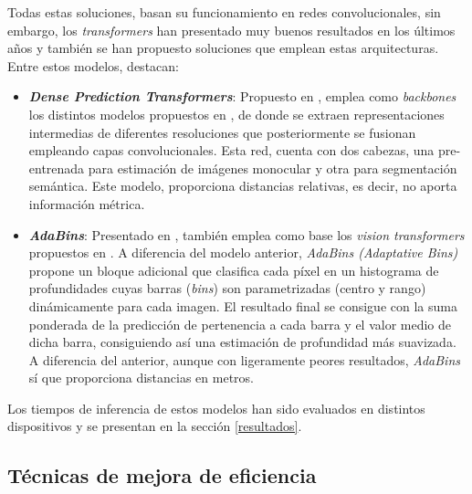 \documentclass[a4paper]{article}
\newcommand{\textbfit}[1]{\textbf{\textit{#1}}}
\begin{document}
Todas estas soluciones, basan su funcionamiento en redes convolucionales, sin embargo, los \textit{transformers} han presentado muy buenos resultados en los últimos años y también se han propuesto soluciones que emplean estas arquitecturas. Entre estos modelos, destacan:
\begin{itemize}
    \item \textbfit{Dense Prediction Transformers}: Propuesto en \cite{visiontransformersDPT}, emplea como \textit{backbones} los distintos modelos propuestos en \cite{image16x16words}, de donde se extraen representaciones intermedias de diferentes resoluciones que posteriormente se fusionan empleando capas convolucionales. Esta red, cuenta con dos cabezas, una pre-entrenada para estimación de imágenes monocular y otra para segmentación semántica. Este modelo, proporciona distancias relativas, es decir, no aporta información métrica.
    \item \textbfit{AdaBins}: Presentado en \cite{bhat2020adabins}, también emplea como base los \textit{vision transformers} propuestos en \cite{image16x16words}. A diferencia del modelo anterior, \textit{AdaBins (Adaptative Bins)} propone un bloque adicional que clasifica cada píxel en un histograma de profundidades cuyas barras (\textit{bins}) son parametrizadas (centro y rango) dinámicamente para cada imagen. El resultado final se consigue con la suma ponderada de la predicción de pertenencia a cada barra y el valor medio de dicha barra, consiguiendo así una estimación de profundidad más suavizada. A diferencia del anterior, aunque con ligeramente peores resultados, \textit{AdaBins} sí que proporciona distancias en metros.
\end{itemize}
Los tiempos de inferencia de estos modelos han sido evaluados en distintos dispositivos y se presentan en la sección \ref{resultados}.

\subsection{Técnicas de mejora de eficiencia} \label{eficiencia-general}

\end{document}
